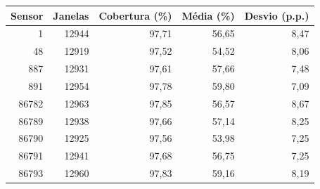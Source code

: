 \begin{tabular}{rrrrr}
\toprule
Sensor & Janelas & Cobertura (\%) & Média (\%) & Desvio (p.p.) \\
\midrule
1 & 12944 & 97,71 & 56,65 & 8,47 \\
48 & 12919 & 97,52 & 54,52 & 8,06 \\
887 & 12931 & 97,61 & 57,66 & 7,48 \\
891 & 12954 & 97,78 & 59,80 & 7,09 \\
86782 & 12963 & 97,85 & 56,57 & 8,67 \\
86789 & 12938 & 97,66 & 57,14 & 8,25 \\
86790 & 12925 & 97,56 & 53,98 & 7,25 \\
86791 & 12941 & 97,68 & 56,75 & 7,25 \\
86793 & 12960 & 97,83 & 59,16 & 8,19 \\
\bottomrule
\end{tabular}
